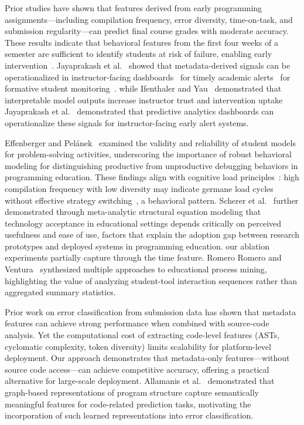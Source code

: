 \documentclass[acmsmall]{acmart}
\begin{document}
Prior studies have shown that features derived from early programming
assignments---including compilation frequency, error diversity, time-on-task,
and submission regularity---can predict final course grades with moderate
accuracy. These results indicate that behavioral
features from the first four weeks of a semester are sufficient to identify
students at risk of failure, enabling early intervention~\cite{jadud2006methods,brown2014blackbox}. Jayaprakash et al.~\cite{jayaprakash2014early} showed that metadata-derived signals can be operationalized in instructor-facing dashboards~\cite{verbert2013learning} for timely academic alerts~\cite{pears2007survey,jayaprakash2014early,shute2013formative} for formative student monitoring~\cite{shute2013formative}.
while Ifenthaler and Yau~\cite{ifenthaler2020utilising} demonstrated that interpretable model outputs increase instructor trust and intervention uptake Jayaprakash et al.~\cite{jayaprakash2014early} demonstrated that predictive analytics dashboards can operationalize these signals for instructor-facing early alert systems.

Effenberger and Pel\'anek~\cite{effenberger2021validity} examined the
validity and reliability of student models for problem-solving activities,
underscoring the importance of robust behavioral modeling for distinguishing
productive from unproductive debugging behaviors in programming education. These findings align with cognitive load principles~\cite{sweller2011cognitive}:
high compilation frequency with low diversity may indicate germane load cycles
without effective strategy switching~\cite{kirschner2018cognitive}, a behavioral pattern. Scherer et al.~\cite{scherer2018meta} further demonstrated through meta-analytic structural equation modeling that technology acceptance in educational settings depends critically on perceived usefulness and ease of use, factors that explain the adoption gap between research prototypes and deployed systems in programming education. our ablation experiments partially capture through the time feature. Romero Romero and Ventura~\cite{romero2013data}
synthesized multiple approaches to educational process mining, highlighting the
value of analyzing student-tool interaction sequences rather than aggregated
summary statistics.

Prior work on error classification from submission data has shown that
metadata features can achieve strong performance when combined with
source-code analysis. Yet the computational cost of extracting
code-level features (ASTs, cyclomatic complexity, token diversity)
limits scalability for platform-level deployment. Our approach demonstrates
that metadata-only features---without source code access---can achieve
competitive accuracy, offering a practical alternative for large-scale
deployment. Allamanis et al.~\cite{allamanis2018learning} demonstrated that
graph-based representations of program structure capture semantically
meaningful features for code-related prediction tasks, motivating the
incorporation of such learned representations into error classification.
\end{document}
